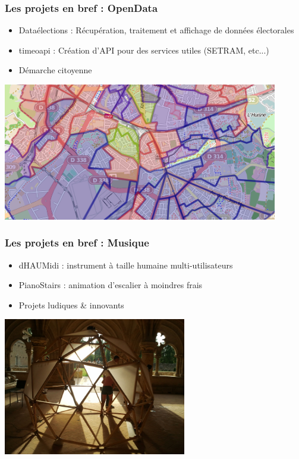 \documentclass[10pt, compress]{beamer}
\begin{document}
\begin{frame}[fragile]
	\frametitle{Les projets en bref : OpenData}

	\begin{itemize}
		\item \alert{Dataélections} : Récupération, traitement et affichage de données électorales
		\item \alert{timeoapi} : Création d'API pour des services utiles (SETRAM, etc...)
		\item Démarche citoyenne
	\end{itemize}

	\begin{center}
		\includegraphics[width=0.9\textwidth]{europeenes.png}
	\end{center}
\end{frame}

\begin{frame}[fragile]
	\frametitle{Les projets en bref : Musique}

	\begin{itemize}
		\item \alert{dHAUMidi} : instrument à taille humaine multi-utilisateurs
		\item \alert{PianoStairs} : animation d'escalier à moindres frais
		\item Projets ludiques \& innovants
	\end{itemize}

	\begin{center}
		\includegraphics[width=0.6\textwidth]{dhaum.png}
	\end{center}
\end{frame}
\end{document}
